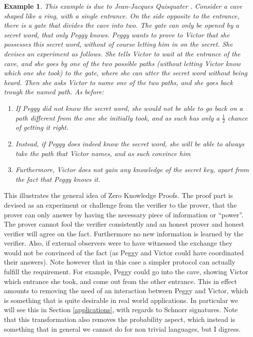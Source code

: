 \documentclass{article}
\newtheorem{example}{Example}
\begin{document}
\begin{example}
    This example is due to Jean-Jacques Quisquater \cite{quisquaterHowExplainZeroknowledge1989}.
    Consider a cave shaped like a ring, with a single entrance.
    On the side opposite to the entrance, there is a gate that divides the cave into two.
    The gate can only be opened by a secret word, that only Peggy knows.
    Peggy wants to prove to Victor that she possesses this secret word, without of course letting him in on the secret.
    She devises an experiment as follows.
    She tells Victor to wait at the entrance of the cave, and she goes by one of the two possible paths (without letting Victor know which one she took) to the gate, where she can utter the secret word without being heard.
    Then she asks Victor to name one of the two paths, and she goes back trough the named path.
    As before:
    \begin{enumerate}
        \item If Peggy did not know the secret word, she would not be able to go back on a path different from the one she initially took, and as such has only a $\frac{1}{2}$ chance of getting it right.
        \item Instead, if Peggy does indeed know the secret word, she will be able to always take the path that Victor names, and as such convince him
        \item Furthermore, Victor does not gain any knowledge of the secret key, apart from the fact that Peggy knows it.
    \end{enumerate}
\end{example}

This illustrates the general idea of Zero Knowledge Proofs. The proof part is devised as an experiment or challenge from the verifier to the prover, that the prover can only answer by having the necessary piece of information or \enquote{power}. The prover cannot fool the verifier consistently and an honest prover and honest verifier will agree on the fact. Furthermore no new information is learned by the verifier. Also, if external observers were to have witnessed the exchange they would not be convinced of the fact (as Peggy and Victor could have coordinated their answers).
Note however that in this case a simpler protocol can actually fulfill the requirement. For example, Peggy could
go into the cave, showing Victor which entrance she took, and come out from the other entrance. This in effect amounts
to removing the need of an interaction between Peggy and Victor, which is something that is quite desirable in real world
applications. In particular we will see this in Section \ref{applications}, with regards to Schnorr signatures. Note that this transformation
also removes the probability aspect, which instead is something that in general we cannot do for non trivial languages, but I digress. \par
\end{document}
